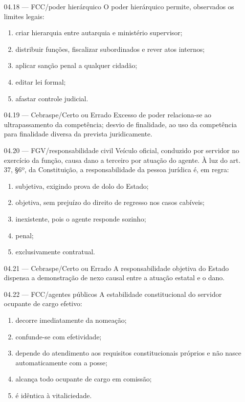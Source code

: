 \begin{questao}{ 04.18 — FCC/poder hierárquico}
O poder hierárquico permite, observados os limites legais:
\begin{enumerate}[label=\Alph*)]
\item criar hierarquia entre autarquia e ministério supervisor;
\item distribuir funções, fiscalizar subordinados e rever atos internos;
\item aplicar sanção penal a qualquer cidadão;
\item editar lei formal;
\item afastar controle judicial.
\end{enumerate}
\end{questao}

\begin{questao}{ 04.19 — Cebraspe/Certo ou Errado}
Excesso de poder relaciona-se ao ultrapassamento da competência; desvio de finalidade, ao uso da competência para finalidade diversa da prevista juridicamente.
\end{questao}

\begin{questao}{ 04.20 — FGV/responsabilidade civil}
Veículo oficial, conduzido por servidor no exercício da função, causa dano a terceiro por atuação do agente. À luz do art. 37, §6º, da Constituição, a responsabilidade da pessoa jurídica é, em regra:
\begin{enumerate}[label=\Alph*)]
\item subjetiva, exigindo prova de dolo do Estado;
\item objetiva, sem prejuízo do direito de regresso nos casos cabíveis;
\item inexistente, pois o agente responde sozinho;
\item penal;
\item exclusivamente contratual.
\end{enumerate}
\end{questao}

\begin{questao}{ 04.21 — Cebraspe/Certo ou Errado}
A responsabilidade objetiva do Estado dispensa a demonstração de nexo causal entre a atuação estatal e o dano.
\end{questao}

\begin{questao}{ 04.22 — FCC/agentes públicos}
A estabilidade constitucional do servidor ocupante de cargo efetivo:
\begin{enumerate}[label=\Alph*)]
\item decorre imediatamente da nomeação;
\item confunde-se com efetividade;
\item depende do atendimento aos requisitos constitucionais próprios e não nasce automaticamente com a posse;
\item alcança todo ocupante de cargo em comissão;
\item é idêntica à vitaliciedade.
\end{enumerate}
\end{questao}

